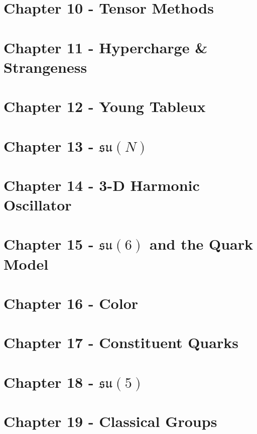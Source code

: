 \documentclass[a4paper,11pt]{article}
\begin{document}
\section{Chapter 10 - Tensor Methods}\label{Sec:10}


\section{Chapter 11 - Hypercharge \& Strangeness}\label{Sec:11}


\section{Chapter 12 - Young Tableux}\label{Sec:12}


\section{Chapter 13 - $\mathfrak{su}(N)$}\label{Sec:13}


\section{Chapter 14 - 3-D Harmonic Oscillator}\label{Sec:14}


\section{Chapter 15 - $\mathfrak{su}(6)$ and the Quark Model}\label{Sec:15}


\section{Chapter 16 - Color}\label{Sec:16}


\section{Chapter 17 - Constituent Quarks}\label{Sec:17}


\section{Chapter 18 - $\mathfrak{su}(5)$}\label{Sec:18}


\section{Chapter 19 - Classical Groups}\label{Sec:19}

\end{document}
